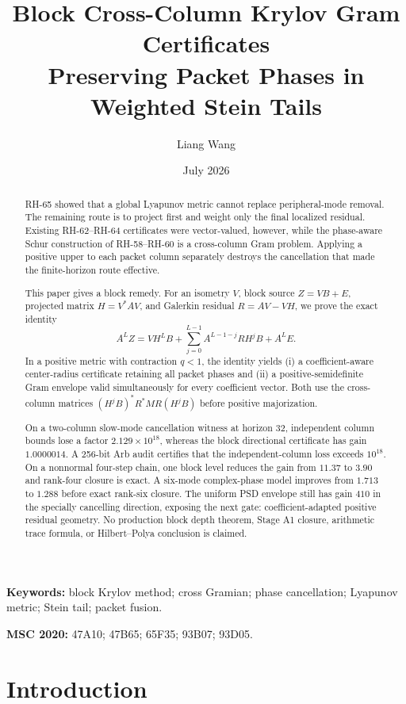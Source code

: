 \documentclass[11pt]{article}
\title{Block Cross-Column Krylov Gram Certificates\\
\large Preserving Packet Phases in Weighted Stein Tails}
\author{Liang Wang}
\date{July 2026}
\begin{document}
\maketitle

\begin{abstract}
RH-65 showed that a global Lyapunov metric cannot replace peripheral-mode
removal.  The remaining route is to project first and weight only the final
localized residual.  Existing RH-62--RH-64 certificates were vector-valued,
however, while the phase-aware Schur construction of RH-58--RH-60 is a
cross-column Gram problem.  Applying a positive upper to each packet column
separately destroys the cancellation that made the finite-horizon route
effective.

This paper gives a block remedy.  For an isometry $V$, block source
$Z=VB+E$, projected matrix $H=V^*AV$, and Galerkin residual $R=AV-VH$, we
prove the exact identity
\[
 A^LZ=VH^LB+
 \sum_{j=0}^{L-1}A^{L-1-j}RH^jB+A^LE.
\]
In a positive metric with contraction $q<1$, the identity yields (i) a
coefficient-aware center-radius certificate retaining all packet phases and
(ii) a positive-semidefinite Gram envelope valid simultaneously for every
coefficient vector.  Both use the cross-column matrices
$(H^jB)^*R^*MR(H^jB)$ before positive majorization.

On a two-column slow-mode cancellation witness at horizon $32$, independent
column bounds lose a factor $2.129\times10^{18}$, whereas the block
directional certificate has gain $1.0000014$.  A 256-bit Arb audit certifies
that the independent-column loss exceeds $10^{18}$.  On a nonnormal
four-step chain, one block level reduces the gain from $11.37$ to $3.90$ and
rank-four closure is exact.  A six-mode complex-phase model improves from
$1.713$ to $1.288$ before exact rank-six closure.  The uniform PSD envelope
still has gain $410$ in the specially cancelling direction, exposing the next
gate: coefficient-adapted positive residual geometry.  No production block
depth theorem, Stage A1 closure, arithmetic trace formula, or Hilbert--Polya
conclusion is claimed.
\end{abstract}

\noindent\textbf{Keywords:} block Krylov method; cross Gramian; phase
cancellation; Lyapunov metric; Stein tail; packet fusion.

\medskip
\noindent\textbf{MSC 2020:} 47A10; 47B65; 65F35; 93B07; 93D05.

\section{Introduction}
\end{document}
